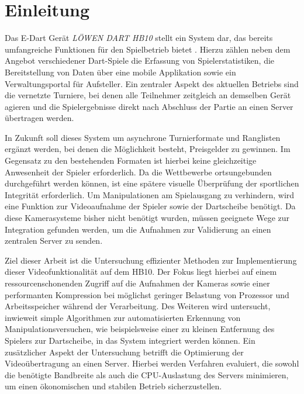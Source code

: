 
\section{Einleitung}

Das E-Dart Gerät \textit{LÖWEN DART HB10} stellt ein System dar, das bereits umfangreiche Funktionen für den Spielbetrieb bietet \parencite{lwenentertainment_2026_lwen}. Hierzu zählen neben dem Angebot verschiedener Dart-Spiele die Erfassung von Spielerstatistiken, 
die Bereitstellung von Daten über eine mobile Applikation sowie ein Verwaltungsportal für Aufsteller. Ein zentraler Aspekt des aktuellen Betriebs sind die vernetzte Turniere, bei denen alle Teilnehmer zeitgleich an demselben Gerät agieren 
und die Spielergebnisse direkt nach Abschluss der Partie an einen Server übertragen werden.\newline

In Zukunft soll dieses System um asynchrone Turnierformate und Ranglisten ergänzt werden, bei denen die Möglichkeit besteht, Preisgelder zu gewinnen. Im Gegensatz zu den bestehenden Formaten ist hierbei keine gleichzeitige Anwesenheit der Spieler erforderlich. 
Da die Wettbewerbe ortsungebunden durchgeführt werden können, ist eine spätere visuelle Überprüfung der sportlichen Integrität erforderlich. Um Manipulationen am Spielausgang zu verhindern, wird eine Funktion zur Videoaufnahme der Spieler sowie der Dartscheibe benötigt. 
Da diese Kamerasysteme bisher nicht benötigt wurden, müssen geeignete Wege zur Integration gefunden werden, um die Aufnahmen zur Validierung an einen zentralen Server zu senden.\newline

Ziel dieser Arbeit ist die Untersuchung effizienter Methoden zur Implementierung dieser Videofunktionalität auf dem HB10. 
Der Fokus liegt hierbei auf einem ressourcenschonenden Zugriff auf die Aufnahmen der Kameras sowie einer performanten Kompression bei möglichst geringer Belastung von Prozessor und 
Arbeitsspeicher während der Verarbeitung. Des Weiteren wird untersucht, inwieweit simple Algorithmen zur automatisierten Erkennung von Manipulationsversuchen, wie beispielsweise einer zu kleinen Entfernung des Spielers zur Dartscheibe,
in das System integriert werden können. Ein zusätzlicher Aspekt der Untersuchung betrifft die Optimierung der Videoübertragung an einen Server. 
Hierbei werden Verfahren evaluiert, die sowohl die benötigte Bandbreite als auch die CPU-Auslastung des Servers minimieren, um einen ökonomischen und stabilen Betrieb sicherzustellen.

\vspace{1em}

